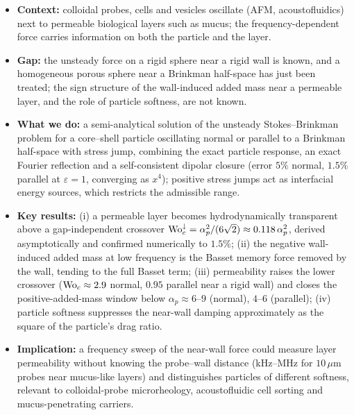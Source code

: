\begin{itemize}
  \item \textbf{Context:} colloidal probes, cells and vesicles oscillate (AFM, acoustofluidics) next to permeable
        biological layers such as mucus; the frequency-dependent force carries information on both the particle and the
        layer.
  \item \textbf{Gap:} the unsteady force on a rigid sphere near a rigid wall is known, and a homogeneous porous sphere near a
        Brinkman half-space has just been treated; the sign structure of the wall-induced added mass near a permeable
        layer, and the role of particle softness, are not known.
  \item \textbf{What we do:} a semi-analytical solution of the unsteady Stokes--Brinkman problem for a core--shell
        particle oscillating normal or parallel to a Brinkman half-space with stress jump, combining the exact particle
        response, an exact Fourier reflection and a self-consistent dipolar closure (error $5\%$ normal, $1.5\%$
        parallel at $\varepsilon=1$, converging as $x^4$); positive stress jumps act as interfacial energy sources, which
        restricts the admissible range.
  \item \textbf{Key results:} (i) a permeable layer becomes hydrodynamically transparent above a gap-independent
        crossover $\mathrm{Wo}_c^{\downarrow}=\alpha_p^2/(6\sqrt2)\approx0.118\,\alpha_p^2$, derived asymptotically and confirmed
        numerically to $1.5\%$; (ii) the negative wall-induced added mass at low frequency is the Basset memory force
        removed by the wall, tending to the full Basset term; (iii) permeability raises the lower crossover
        ($\mathrm{Wo}_c\approx2.9$ normal, $0.95$ parallel near a rigid wall) and closes the positive-added-mass window below
        $\alpha_p\approx6$--$9$ (normal), $4$--$6$ (parallel); (iv) particle softness suppresses the near-wall damping
        approximately as the square of the particle's drag ratio.
  \item \textbf{Implication:} a frequency sweep of the near-wall force could measure layer permeability without knowing
        the probe--wall distance (kHz--MHz for $10\,\mu$m probes near mucus-like layers) and distinguishes particles of
        different softness, relevant to colloidal-probe microrheology, acoustofluidic cell sorting and
        mucus-penetrating carriers.
\end{itemize}
